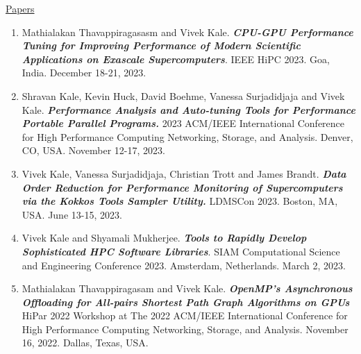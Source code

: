 




\underline{Papers}
\begin{enumerate} 
\item Mathialakan Thavappiragasasm and Vivek Kale. \textbf{\it CPU-GPU Performance Tuning for Improving Performance of Modern Scientific Applications on Exascale Supercomputers}. IEEE HiPC 2023. Goa, India. December 18-21, 2023.
\item Shravan Kale, Kevin Huck, David Boehme, Vanessa Surjadidjaja and Vivek Kale. \textbf{\it Performance Analysis and Auto-tuning Tools for Performance Portable Parallel Programs.} 2023 ACM/IEEE International Conference for High Performance Computing Networking, Storage, and Analysis. Denver, CO, USA. November 12-17, 2023.

\item Vivek Kale, Vanessa Surjadidjaja, Christian Trott and James Brandt. \textbf{\it Data Order Reduction for Performance Monitoring of Supercomputers via the Kokkos Tools Sampler Utility. } LDMSCon 2023. Boston, MA, USA. June 13-15, 2023.

\item Vivek Kale and Shyamali Mukherjee. \textbf{\it Tools to Rapidly Develop Sophisticated HPC Software Libraries}. SIAM Computational Science and Engineering Conference 2023. Amsterdam, Netherlands. March 2, 2023.

\item Mathialakan Thavappiragasam and Vivek Kale. \textbf{ \it OpenMP’s Asynchronous Offloading for All-pairs Shortest Path Graph Algorithms on GPUs}  HiPar 2022 Workshop at The 2022 ACM/IEEE International Conference for High Performance Computing Networking, Storage, and Analysis. November 16, 2022. Dallas, Texas, USA.


\end{enumerate}
